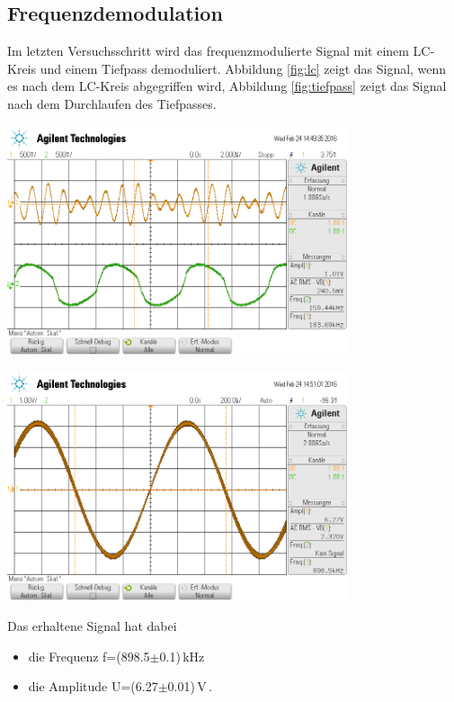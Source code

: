 \documentclass[]{scrartcl}
\begin{document}
\subsection{Frequenzdemodulation}
Im letzten Versuchsschritt wird das frequenzmodulierte Signal mit einem LC-Kreis und einem Tiefpass demoduliert. Abbildung \ref{fig:lc} zeigt das Signal, wenn es nach dem LC-Kreis abgegriffen wird, Abbildung \ref{fig:tiefpass} zeigt das Signal nach dem Durchlaufen des Tiefpasses. \\
\begin{center}
	\includegraphics[width=10cm]{images/lc.png}
	\label{fig:lc}
\end{center}
\begin{center}
	\includegraphics[width=10cm]{images/tiefpass.png}
	\label{fig:tiefpass}
\end{center}
Das erhaltene Signal hat dabei
\begin{itemize}
	\item die Frequenz f=(898.5$\pm$0.1)\,kHz
	\item die Amplitude U=(6.27$\pm$0.01)\,V\,.
\end{itemize}
\end{document}

